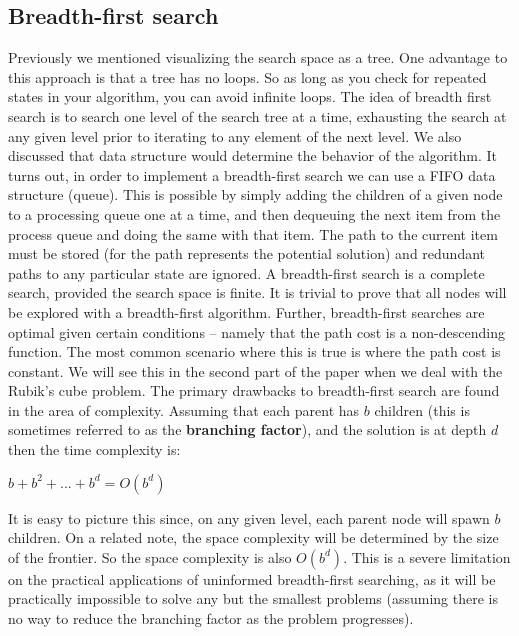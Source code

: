 \documentclass[a4paper,11pt]{report}
\begin{document}
\subsection{Breadth-first search}
Previously we mentioned visualizing the search space as a tree.  One advantage
to this approach is that a tree has no loops.  So as long as you check for
repeated states in your algorithm, you can avoid infinite loops.  The idea of
breadth first search is to search one level of the search tree at a time,
exhausting the search at any given level prior to iterating to any element of
the next level.  We also discussed that data structure would determine the 
behavior of the algorithm.  It turns out, in order to implement a breadth-first
search we can use a FIFO data structure (queue).\cite{norvig} This is possible
by simply adding the children of a given node to a processing queue one at a
time, and then dequeuing the next item from the process queue and doing the
same with that item. The path to the current item must be stored (for the path
represents the potential solution) and redundant paths to any particular state
are ignored.\cite{norvig} A breadth-first search is a complete search, provided
the search space is finite.  It is trivial to prove that all nodes will be
explored with a breadth-first algorithm.  Further, breadth-first searches are
optimal given certain conditions -- namely that the path cost is a
non-descending function.  The most common scenario where this is true is where
the path cost is constant.\cite{norvig}  We will see this in the second part of
the paper when we deal with the Rubik's cube problem. The primary drawbacks to
breadth-first search are found in the area of complexity.  Assuming that each
parent has $b$ children (this is sometimes referred to as the 
\textbf{branching factor}), and the solution is at depth $d$ then the 
time complexity is:\vspace{5 mm}

$b + b^2 + ... + b^d = O(b^d)$ \cite{norvig}\vspace{5 mm}

It is easy to picture this since, on any given level, each parent node will
spawn $b$ children.  On a related note, the space complexity will be
determined by the size of the frontier.\cite{norvig} So the space complexity is
also $O(b^d)$.  This is a severe limitation on the
practical applications of uninformed breadth-first searching, as it will be
practically impossible to solve any but the smallest problems (assuming there
is no way to reduce the branching factor as the problem progresses).
\end{document}

